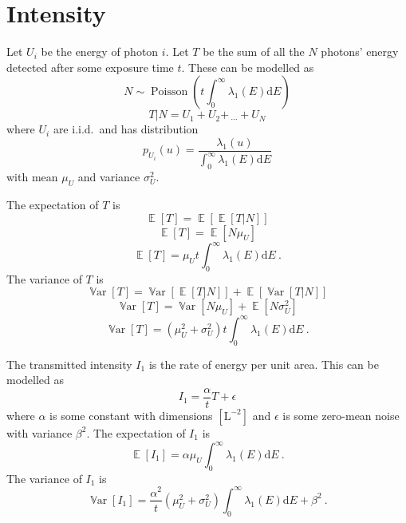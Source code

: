 \documentclass[12pt]{report}
\DeclareMathOperator{\expectation}{\mathbb{E}}
\DeclareMathOperator{\variance}{\mathbb{V}ar}
\DeclareMathOperator{\poisson}{Poisson}
\newcommand{\diff}{\mathrm{d}}
\newcommand{\dotdotdot}{_{\phantom{.}\cdots}}
\begin{document}
\section{Intensity}
Let $U_i$ be the energy of photon $i$. Let $T$ be the sum of all the $N$ photons' energy detected after some exposure time $t$. These can be modelled as
\begin{equation}
N\sim\poisson\left(t\int_0^{\infty}\lambda_1(E)\diff E\right)
\end{equation}
\begin{equation}
T|N = U_1 + U_2 + \dotdotdot + U_N
\end{equation}
where $U_i$ are i.i.d.~and has distribution
\begin{equation}
p_{U_i}(u) = \frac{\lambda_1(u)}{\int_0^{\infty}\lambda_1(E)\diff E}
\end{equation}
with mean $\mu_U$ and variance $\sigma_U^2$.

The expectation of $T$ is
\begin{equation}
\expectation[T] = \expectation[\expectation[T|N]]
\end{equation}
\begin{equation}
\expectation[T] = \expectation[N\mu_U]
\end{equation}
\begin{equation}
\expectation[T] = \mu_U t\int_0^{\infty}\lambda_1(E)\diff E \ .
\end{equation}
The variance of $T$ is
\begin{equation}
\variance[T] = \variance[\expectation[T|N]] + \expectation[\variance[T|N]]
\end{equation}
\begin{equation}
\variance[T] = \variance[N\mu_U] + \expectation[N\sigma_U^2]
\end{equation}
\begin{equation}
\variance[T] = \left(\mu_U^2+\sigma_U^2\right)t\int_0^{\infty}\lambda_1(E)\diff E \ .
\end{equation}

The transmitted intensity $I_1$ is the rate of energy per unit area. This can be modelled as
\begin{equation}
I_1 = \frac{\alpha}{t}T + \epsilon
\end{equation}
where $\alpha$ is some constant with dimensions $\left[\text{L}^{-2}\right]$ and $\epsilon$ is some zero-mean noise with variance $\beta^2$.
The expectation of $I_1$ is
\begin{equation}
\expectation[I_1] = \alpha\mu_U \int_0^{\infty}\lambda_1(E)\diff E \ .
\end{equation}
The variance of $I_1$ is
\begin{equation}
\variance[I_1] = \frac{\alpha^2}{t}\left(\mu_U^2+\sigma_U^2\right)\int_0^{\infty}\lambda_1(E)\diff E+\beta^2 \ .
\end{equation}
\end{document}
